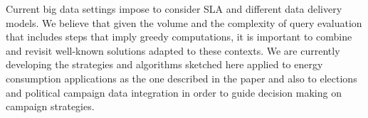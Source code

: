 \documentclass{llncs}
\begin{document}
Current big data settings impose to consider SLA and different data delivery models. We believe that given the volume and the complexity of query evaluation that includes steps that imply greedy computations, it is important to combine and revisit well-known solutions adapted to these contexts. We are currently developing the strategies and algorithms sketched here applied to energy consumption applications as the one described in the paper and also to elections and political campaign data integration in order to guide decision making on campaign strategies.


\end{document}
